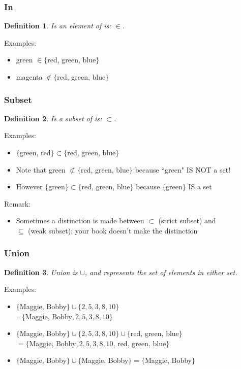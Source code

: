 \documentclass{beamer}
\newtheorem{defn}{Definition}
\numberwithin{equation}{section}
\begin{document}
\begin{frame}
\frametitle{In}

\begin{defn}
Is an element of is: $\in$.
\end{defn}
\pause

{Examples: } \pause
\begin{itemize}
\item green $\in \{$red, green, blue$\}$
\item magenta $\not\in \{$red, green, blue$\}$
\end{itemize}
   
\end{frame}



\begin{frame}
\frametitle{Subset}

\begin{defn}
Is a subset of is: $\subset$.
\end{defn}
\pause

{Examples: } \pause
\begin{itemize}
\item $\{$green, red$\} \subset \{$red, green, blue$\}$ \pause
\item Note that green $\not\subset \{$red, green, blue$\}$ because ``green" IS NOT a set! \pause
\item However $\{$green$\}\subset \{$red, green, blue$\}$ because $\{$green$\}$ IS a set \pause
\end{itemize}

{Remark: }
\begin{itemize}
\item Sometimes a distinction is made between $\subset$ (strict subset) and \\ $\subseteq$ (weak subset); your book doesn't make the distinction
\end{itemize}

\end{frame}



\begin{frame}
\frametitle{Union}

\begin{defn}
Union is $\cup$, and represents the set of elements in \textit{either} set.
\end{defn}
\pause

{Examples: }
\begin{itemize}
\item $\{$Maggie, Bobby$\} \cup \{2, 5, 3, 8, 10\}$ \\ =$\{$Maggie, Bobby$, 2, 5, 3, 8, 10\}$ \pause
\item $\{$Maggie, Bobby$\} \cup \{2, 5, 3, 8, 10\} \cup \{$red, green, blue$\}$ \\ $=\{$Maggie, Bobby$, 2, 5, 3, 8, 10$, red, green, blue$\}$ \pause
\item $\{$Maggie, Bobby$\} \cup \{$Maggie, Bobby$\} =\{$Maggie, Bobby$\}$
\end{itemize}

\end{frame}
\end{document}

